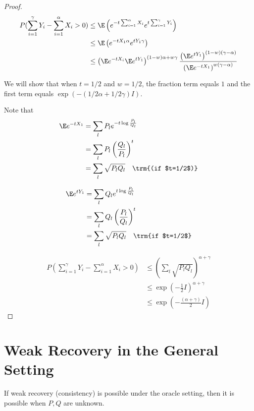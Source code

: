 \documentclass{article}
\begin{document}
\begin{proof}
\begin{align*}
P( \sum_{i=1}^\gamma Y_i - \sum_{i=1}^\alpha X_i > 0 ) &\leq 
  \E \left( e^{- t \sum_{i=1}^\alpha X_i} e^{t \sum_{i=1}^\gamma Y_i} \right) \\
 & \leq  \E \left( e^{ - t X_1 \alpha} e^{ t Y_1 \gamma} \right ) \\
 &\leq \left( \E e^{ - t X_i} \E e^{t Y_1} \right)^{(1-w)\alpha + w \gamma} 
       \frac{ \left( \E e^{t Y_1} \right)^{(1-w)(\gamma - \alpha)} }
            { \left( \E e^{-t X_1} \right)^{w (\gamma - \alpha)} }
\end{align*}

We will show that when $t=1/2$ and $w=1/2$, the fraction term equals $1$ and the first term equals $\exp\left( - (1/2 \alpha + 1/2 \gamma) I \right)$. 

Note that 
\begin{align*}
\E e^{ -t X_1} &= \sum_l P_l e^{ - t \log \frac{P_l}{Q_l}} \\
   &= \sum_l P_l \left( \frac{Q_l}{P_l} \right)^t \\ 
   &= \sum_l \sqrt{P_l Q_l} \quad \trm{(if $t=1/2$)}
\end{align*}

\begin{align*}
\E e^{ t Y_1} &= \sum_l Q_l e^{ t \log \frac{P_l}{Q_l} } \\
   &= \sum_l Q_l \left( \frac{P_l}{Q_l} \right)^t \\
   &= \sum_l \sqrt{P_l Q_l} \quad \trm{if $t=1/2$}
\end{align*}

\begin{align*}
P( \sum_{i=1}^\gamma Y_i - \sum_{i=1}^\alpha X_i > 0) &\leq 
    \left( \sum_l \sqrt{P_lQ_l} \right)^{\alpha + \gamma} \\
   &\leq  \exp( - \frac{1}{2} I)^{\alpha + \gamma} \\
   &\leq \exp\left( - \frac{(\alpha+\gamma)}{2}  I \right)
\end{align*}
   

\end{proof}

\section{Weak Recovery in the General Setting}

\begin{proposition}
\label{prop:consistency_possible}
 If weak recovery (consistency) is possible under the oracle setting, then it is possible when $P,Q$ are unknown.
\end{proposition}
\end{document}

